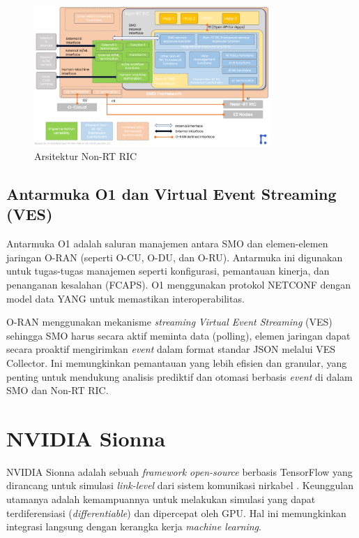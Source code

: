 \begin{figure}[htbp]
    \centering
    \includegraphics[width=0.8\textwidth]{assets/pics/oran-nonrt.png}
    \caption{Arsitektur Non-RT RIC}
    \label{fig:nonrt_ric_architecture}
\end{figure}

\subsection{Antarmuka O1 dan Virtual Event Streaming (VES)}
Antarmuka O1 adalah saluran manajemen antara SMO dan elemen-elemen jaringan O-RAN (seperti O-CU, O-DU, dan O-RU). Antarmuka ini digunakan untuk tugas-tugas manajemen seperti konfigurasi, pemantauan kinerja, dan penanganan kesalahan (FCAPS). O1 menggunakan protokol NETCONF dengan model data YANG untuk memastikan interoperabilitas.

O-RAN menggunakan mekanisme \textit{streaming} \textit{Virtual Event Streaming} (VES) sehingga SMO harus secara aktif meminta data (polling), elemen jaringan dapat secara proaktif mengirimkan \textit{event} dalam format standar JSON melalui VES Collector. Ini memungkinkan pemantauan  yang lebih efisien dan granular, yang penting untuk mendukung analisis prediktif dan otomasi berbasis \textit{event} di dalam SMO dan Non-RT RIC.

\section{NVIDIA Sionna}
NVIDIA Sionna adalah sebuah \textit{framework open-source} berbasis TensorFlow yang dirancang untuk simulasi \textit{link-level} dari sistem komunikasi nirkabel \cite{nvidia_sionna}. Keunggulan utamanya adalah kemampuannya untuk melakukan simulasi yang dapat terdiferensiasi (\textit{differentiable}) dan dipercepat oleh GPU. Hal ini memungkinkan integrasi langsung dengan kerangka kerja \textit{machine learning}.


